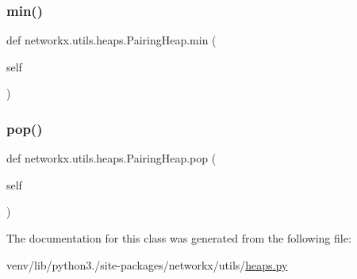 \subsubsection{\texorpdfstring{min()}{min()}}
{\footnotesize\ttfamily def networkx.\+utils.\+heaps.\+Pairing\+Heap.\+min (\begin{DoxyParamCaption}\item[{}]{self }\end{DoxyParamCaption})}

\mbox{\label{classnetworkx_1_1utils_1_1heaps_1_1PairingHeap_a157ec3fcff5a613899477a9568459885}} 
\subsubsection{\texorpdfstring{pop()}{pop()}}
{\footnotesize\ttfamily def networkx.\+utils.\+heaps.\+Pairing\+Heap.\+pop (\begin{DoxyParamCaption}\item[{}]{self }\end{DoxyParamCaption})}



The documentation for this class was generated from the following file\+:\begin{DoxyCompactItemize}
\item 
venv/lib/python3./site-\/packages/networkx/utils/\hyperlink{heaps_8py}{heaps.\+py}\end{DoxyCompactItemize}
